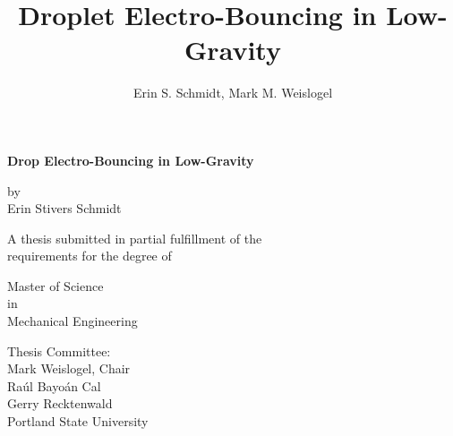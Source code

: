 \documentclass[12pt,a4paper,oneside]{book}
\title{\textsf{\textbf{Droplet Electro-Bouncing in Low-Gravity}}}
\author{Erin S. Schmidt, Mark M. Weislogel}
\date{}
\newcommand\blankpage{%
    \null
    \thispagestyle{empty}%
    \addtocounter{page}{-1}%
    \newpage}
\begin{document}
\begin{titlepage}
\doublespacing

\centering %
{\large \textsf{\textbf{Drop Electro-Bouncing in Low-Gravity}}}

\vspace{15ex}
by\\
Erin Stivers Schmidt

\vspace{15ex}
\singlespacing
A thesis submitted in partial fulfillment of the\\
requirements for the degree of

\vspace{11ex}
Master of Science\\
in\\
Mechanical Engineering

\vspace{12ex}
Thesis Committee:\\
Mark Weislogel, Chair\\
Ra\'ul Bayo\'an Cal\\
Gerry Recktenwald\\


\vfill
\vspace{2ex}
Portland State University\\%
{\number\year}
\end{titlepage}


\doublespacing
\clearpage

\frontmatter

\doublespacing
\end{document}
